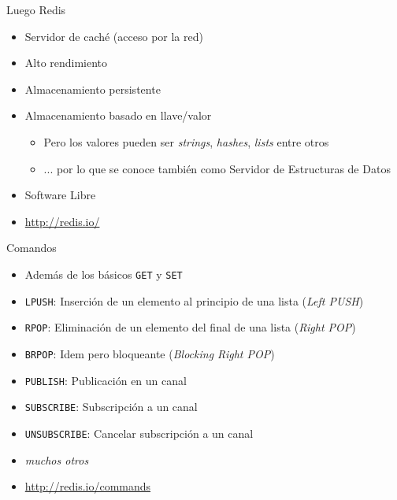 \documentclass[spanish,xcolor=dvipsnames]{beamer}
\begin{document}
\begin{frame}{Luego Redis}
  \begin{itemize}\addtolength{\itemsep}{0.5\baselineskip}
    \item Servidor de caché (acceso por la red)
    \item Alto rendimiento
    \item Almacenamiento persistente
    \item Almacenamiento basado en llave/valor
    \begin{itemize}
      \item Pero los valores pueden ser \textit{strings},
        \textit{hashes}, \textit{lists} entre otros
      \item ... por lo que se conoce también como Servidor de
        Estructuras de Datos
    \end{itemize}
    \item Software Libre
    \item \url{http://redis.io/}
  \end{itemize}
\end{frame}

\begin{frame}{Comandos}
  \begin{itemize}
    \item Además de los básicos \texttt{GET} y \texttt{SET}
  \end{itemize}
  \begin{itemize}
    \item \texttt{LPUSH}: Inserción de un elemento al principio de una lista (\textit{Left PUSH})
    \item \texttt{RPOP}: Eliminación de un elemento del final de una lista (\textit{Right POP})
    \item \texttt{BRPOP}: Idem pero bloqueante (\textit{Blocking Right POP})
    \item \texttt{PUBLISH}: Publicación en un canal
    \item \texttt{SUBSCRIBE}: Subscripción a un canal
    \item \texttt{UNSUBSCRIBE}: Cancelar subscripción a un canal
    \item \textit{muchos otros}
  \end{itemize}
  \begin{itemize}
    \item \url{http://redis.io/commands}
  \end{itemize}
\end{frame}
\end{document}
